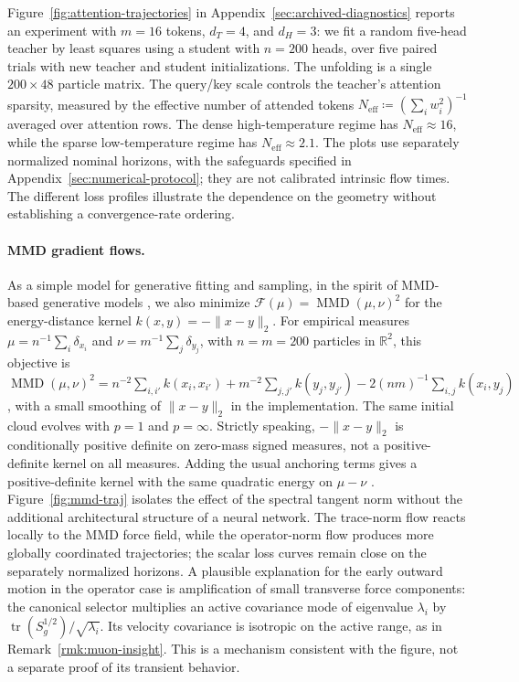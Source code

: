 \documentclass{article}
\newcommand{\R}{\mathbb{R}}
\newcommand{\MF}{\mathcal{F}}
\newcommand{\tr}{\operatorname{tr}}
\begin{document}
Figure~\ref{fig:attention-trajectories} in Appendix~\ref{sec:archived-diagnostics}
reports an experiment with $m=16$
tokens, $d_T=4$, and $d_H=3$: we fit a random five-head teacher by least squares
using a student with $n=200$ heads, over five paired trials with new teacher
and student initializations. The unfolding is a single $200\times48$ particle
matrix. The query/key scale controls the teacher's attention sparsity,
measured by the effective number of attended tokens
$N_{\mathrm{eff}}\coloneqq(\sum_i w_i^2)^{-1}$ averaged over attention rows.
The dense high-temperature regime has $N_{\mathrm{eff}}\approx16$, while the
sparse low-temperature regime has $N_{\mathrm{eff}}\approx2.1$.
The plots use separately normalized nominal horizons, with the safeguards
specified in Appendix~\ref{sec:numerical-protocol}; they are not calibrated
intrinsic flow times. The different loss profiles illustrate the dependence
on the geometry without establishing a convergence-rate ordering.

\paragraph{MMD gradient flows.}
As a simple model for generative fitting and sampling, in the spirit of MMD-based generative models \citep{LiSwerskyZemel2015,BinkowskiSutherlandArbelGretton2018}, we also minimize $\MF(\mu)=\operatorname{MMD}(\mu,\nu)^2$ for the energy-distance kernel $k(x,y)=-\|x-y\|_2$. For empirical measures $\mu=n^{-1}\sum_i\delta_{x_i}$ and $\nu=m^{-1}\sum_j\delta_{y_j}$, with $n=m=200$ particles in $\R^2$, this objective is $\operatorname{MMD}(\mu,\nu)^2=n^{-2}\sum_{i,i'}k(x_i,x_{i'})+m^{-2}\sum_{j,j'}k(y_j,y_{j'})-2(nm)^{-1}\sum_{i,j}k(x_i,y_j)$, with a small smoothing of $\|x-y\|_2$ in the implementation. The same initial cloud evolves with $p=1$ and $p=\infty$.
Strictly speaking, $-\|x-y\|_2$ is conditionally positive definite on
zero-mass signed measures, not a positive-definite kernel on all measures.
Adding the usual anchoring terms gives a positive-definite kernel with the
same quadratic energy on $\mu-\nu$ \citep{SejdinovicSriperumbudurGrettonFukumizu2013}.
%
Figure~\ref{fig:mmd-traj} isolates the effect of the spectral tangent norm without the additional architectural structure of a neural network. The trace-norm flow reacts locally to the MMD force field, while the operator-norm flow produces more globally coordinated trajectories; the scalar loss curves remain close on the separately normalized horizons.
A plausible explanation for the early outward motion in the operator case
is amplification of small transverse force components: the canonical
selector multiplies an active covariance mode of eigenvalue $\lambda_i$ by
$\tr(S_g^{1/2})/\sqrt{\lambda_i}$. Its velocity covariance is isotropic on
the active range, as in Remark~\ref{rmk:muon-insight}. This is a mechanism
consistent with the figure, not a separate proof of its transient behavior.
\end{document}

